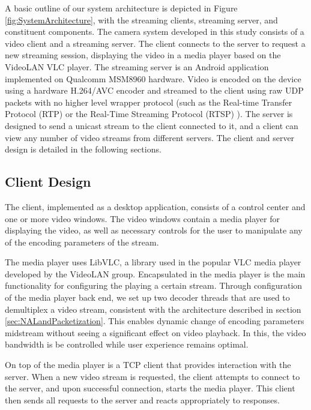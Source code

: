 \documentclass[3p,times,procedia]{elsarticle}
\begin{document}
A basic outline of our system architecture is depicted in Figure \ref{fig:SystemArchitecture}, with the streaming clients, streaming server, and constituent components. The camera system developed in this study consists of a video client and a streaming server. The client connects to the server to request a new streaming session, displaying the video in a media player based on the VideoLAN VLC player. The streaming server is an Android application implemented on Qualcomm MSM8960 hardware. Video is encoded on the device using a hardware H.264/AVC encoder and streamed to the client using raw UDP packets with no higher level wrapper protocol (such as the Real-time Transfer Protocol (RTP) \cite{RTP} or the Real-Time Streaming Protocol (RTSP) \cite{RTSP}). The server is designed to send a unicast stream to the client connected to it, and a client can view any number of video streams from different servers. The client and server design is detailed in the following sections.

\subsection{Client Design}

The client, implemented as a desktop application, consists of a control center and one or more video windows. The video windows contain a media player for displaying the video, as well as necessary controls for the user to manipulate any of the encoding parameters of the stream. 

The media player uses LibVLC, a library used in the popular VLC media player developed by the VideoLAN group. Encapsulated in the media player is the main functionality for configuring the playing a certain stream. Through configuration of the media player back end, we set up two decoder threads that are used to demultiplex a video stream, consistent with the architecture described in section \ref{sec:NALandPacketization}. This enables dynamic change of encoding parameters midstream without seeing a significant effect on video playback. In this, the video bandwidth is be controlled while user experience remains optimal.

On top of the media player is a TCP client that provides interaction with the server. When a new video stream is requested, the client attempts to connect to the server, and upon successful connection, starts the media player. This client then sends all requests to the server and reacts appropriately to responses.
\end{document}
